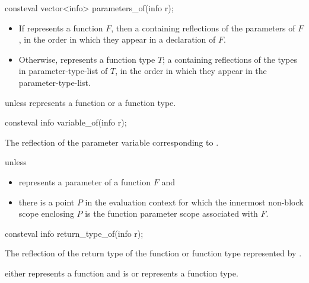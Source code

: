 %
\begin{itemdecl}
consteval vector<info> parameters_of(info r);
\end{itemdecl}

\begin{itemdescr}
\pnum
\returns
\begin{itemize}
\item
  If  represents a function $F$,
  then a  containing reflections of the parameters of $F$,
  in the order in which they appear in a declaration of $F$.
\item
  Otherwise,  represents a function type $T$;
  a  containing reflections of the types
  in parameter-type-list of $T$,
  in the order in which they appear in the parameter-type-list.
\end{itemize}

\pnum
\throws
{} unless
 represents a function or a function type.
\end{itemdescr}

%
\begin{itemdecl}
consteval info variable_of(info r);
\end{itemdecl}

\begin{itemdescr}
\pnum
\returns
The reflection of the parameter variable corresponding to .

\pnum
\throws
{} unless
\begin{itemize}
\item
   represents a parameter of a function $F$ and
\item
  there is a point $P$ in the evaluation context
  for which the innermost non-block scope enclosing $P$
  is the function parameter scope
  associated with $F$.
\end{itemize}
\end{itemdescr}

%
\begin{itemdecl}
consteval info return_type_of(info r);
\end{itemdecl}

\begin{itemdescr}
\pnum
\returns
The reflection of the return type
of the function or function type represented by .

\pnum
\throws
{}
either  represents a function
and  is 
or  represents a function type.
\end{itemdescr}

